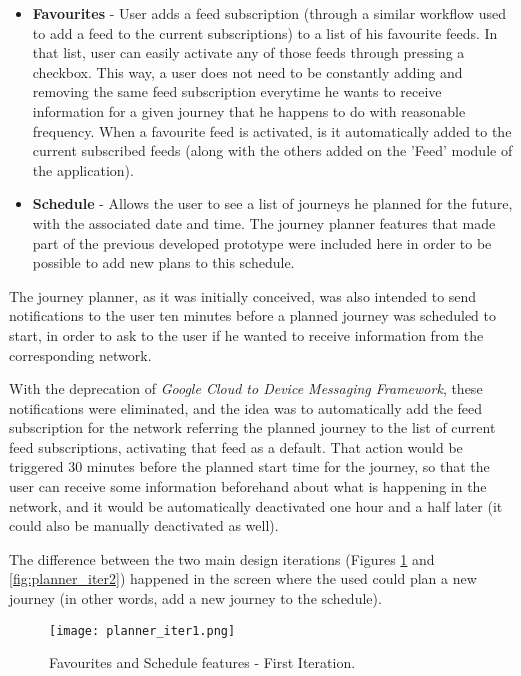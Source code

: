 \begin{itemize}
\item \textbf{Favourites} - User adds a feed subscription (through a similar workflow used to add a feed to the current subscriptions) to a list of his favourite feeds. In that list, user can easily activate any of those feeds through pressing a checkbox. This way, a user does not need to be constantly adding and removing the same feed subscription everytime he wants to receive information for a given journey that he happens to do with reasonable frequency.
When a favourite feed is activated, is it automatically added to the current subscribed feeds (along with the others added on the 'Feed' module of the application).
\item \textbf{Schedule} - Allows the user to see a list of journeys he planned for the future, with the associated date and time. The journey planner features that made part of the previous developed prototype \cite{kn:eSG12} were included here in order to be possible to add new plans to this schedule.
\end{itemize} 

The journey planner, as it was initially conceived, was also intended to send notifications to the user ten minutes before a planned journey was scheduled to start, in order to ask to the user if he wanted to receive information from the corresponding network. 

With the deprecation of \emph{Google Cloud to Device Messaging Framework}, these notifications were eliminated, and the idea was to automatically add the feed subscription for the network referring the planned journey to the list of current feed subscriptions, activating that feed as a default. That action would be triggered 30 minutes before the planned start time for the journey, so that the user can receive some information beforehand about what is happening in the network, and it would be automatically deactivated one hour and a half later (it could also be manually deactivated as well).


The difference between the two main design iterations (Figures \ref{fig:planner_iter1} and \ref{fig:planner_iter2}) happened in the screen where the used could plan a new journey (in other words, add a new journey to the schedule).

\begin{figure}[h!]
  \begin{center}
    \leavevmode
    \texttt{[image: planner\_iter1.png]}
    \caption{Favourites and Schedule features - First Iteration.}
    \label{fig:planner_iter1}
  \end{center}
\end{figure}

